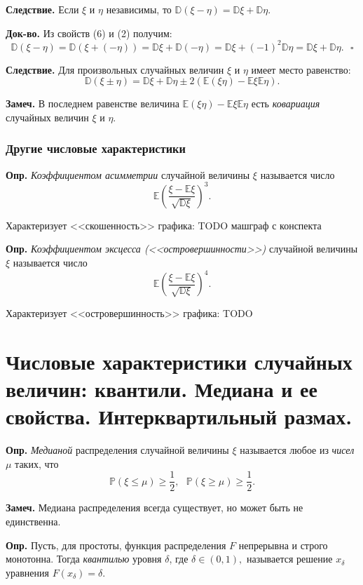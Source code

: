 \documentclass[oneside,final,14pt]{extreport}
\newcommand\mydef{{\bf Опр.}}
\newcommand\mynote{{\bf Замеч.}}
\newcommand\mycon{{\bf Следствие.}}
\newcommand\myqed{{\bf Док-во.}}
\newcommand\myprob[1]{{\mathbb{P}(#1)}}
\theoremstyle{definition}
\begin{document}
\begin{enumerate}
    \mycon{} Если $\xi$ и $\eta$ независимы, то $\mathbb{D}(\xi-\eta)=\mathbb{D} \xi+\mathbb{D} \eta$. 
    
    \myqed{} Из свойств (6) и (2) получим: 
    $$\mathbb{D}(\xi-\eta)=\mathbb{D}(\xi+(-\eta))=\mathbb{D} \xi+\mathbb{D}(-\eta)=\mathbb{D} \xi+(-1)^{2} \mathbb{D} \eta=\mathbb{D} \xi+\mathbb{D} \eta. ~~~ \square$$
    
    \mycon{} Для произвольных случайных величин $\xi$ и $\eta$ имеет место равенство:
    $$\mathbb{D}(\xi \pm \eta)=\mathbb{D} \xi+\mathbb{D} \eta \pm 2(\mathbb{E}(\xi \eta)-\mathbb{E} \xi \mathbb{E} \eta).$$
    
    \mynote{}
    В последнем равенстве величина $\mathbb{E}(\xi \eta)-\mathbb{E} \xi \mathbb{E} \eta$ есть {\it ковариация} случайных величин $\xi$ и $\eta$.
    
\end{enumerate}

\subsubsection{Другие числовые характеристики}

\mydef{} {\it Коэффициентом асимметрии} случайной величины $\xi$ называется число 
$$ \mathbb{E}\left(\frac{\xi - \mathbb{E}\xi}{\sqrt{\mathbb{D}\xi}}\right)^3.$$

Характеризует <<скошенность>> графика: TODO машграф с конспекта

\mydef{} {\it Коэффициентом эксцесса (<<островершинности>>)} случайной величины $\xi$ называется число $$ \mathbb{E}\left(\frac{\xi - \mathbb{E}\xi}{\sqrt{\mathbb{D}\xi}}\right)^4.$$

Характеризует <<островершинность>> графика: TODO

\section {Числовые характеристики случайных величин: квантили. Медиана и ее свойства. Интерквартильный размах.}

\mydef{} {\it Медианой} распределения случайной величины $\xi$ называется любое из {\it чисел} $\mu$ таких, что
$$\myprob{\xi \leqslant \mu} \geqslant \frac{1}{2}, ~~~ \myprob{\xi \geqslant \mu} \geqslant \frac{1}{2}.$$

\mynote{} Медиана распределения всегда существует, но может быть не единственна.

\mydef{} Пусть, для простоты, функция распределения $F$ непрерывна и строго монотонна. Тогда {\it квантилью} уровня $\delta$, где $\delta \in (0, 1), $ называется решение $x_\delta$ уравнения $F(x_\delta) = \delta.$ 
\end{document}
